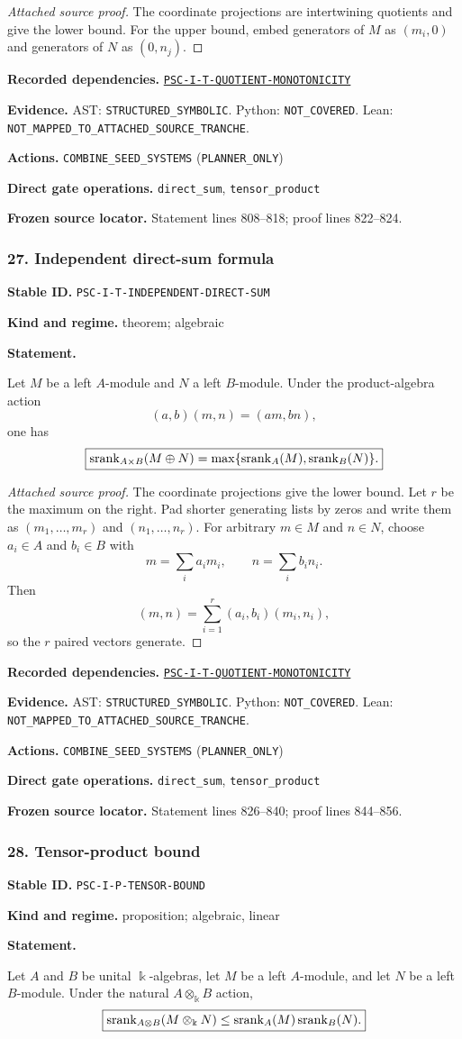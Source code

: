 \documentclass[a4paper,11pt]{article}
\newcommand{\bbk}{\Bbbk}\newcommand{\A}{\mathcal A}\newcommand{\B}{\mathcal B}\newcommand{\Ccal}{\mathcal C}\newcommand{\Pcal}{\mathcal P}\newcommand{\Qcal}{\mathcal Q}\newcommand{\Rcal}{\mathcal R}\newcommand{\Scal}{\mathcal S}
\newcommand{\field}[2]{\noindent\textbf{#1.} #2\par}
\begin{document}
\begin{proof}[Attached source proof]
The coordinate projections are intertwining quotients and give the lower bound.  For the upper bound, embed generators of $M$ as $(m_i,0)$ and generators of $N$ as $(0,n_j)$.
\end{proof}
\field{Recorded dependencies}{\hyperref[rec:PSC-I-T-QUOTIENT-MONOTONICITY]{\nolinkurl{PSC-I-T-QUOTIENT-MONOTONICITY}}}
\field{Evidence}{AST: \nolinkurl{STRUCTURED_SYMBOLIC}. Python: \nolinkurl{NOT_COVERED}. Lean: \nolinkurl{NOT_MAPPED_TO_ATTACHED_SOURCE_TRANCHE}.}
\field{Actions}{\nolinkurl{COMBINE_SEED_SYSTEMS} (\nolinkurl{PLANNER_ONLY})}
\field{Direct gate operations}{\nolinkurl{direct_sum}, \nolinkurl{tensor_product}}
\field{Frozen source locator}{Statement lines 808--818; proof lines 822--824.}
\subsubsection*{27. Independent direct-sum formula}
\label{rec:PSC-I-T-INDEPENDENT-DIRECT-SUM}
\field{Stable ID}{\nolinkurl{PSC-I-T-INDEPENDENT-DIRECT-SUM}}
\field{Kind and regime}{theorem; algebraic}
\textbf{Statement.}\par
Let $M$ be a left $A$-module and $N$ a left $B$-module.  Under the product-algebra action
\[
(a,b)(m,n)=(am,bn),
\]
one has
\[
\boxed{
\operatorname{srank}_{A\times B}(M\oplus N)
=
\max\{\operatorname{srank}_A(M),\operatorname{srank}_B(N)\}.
}
\]

\begin{proof}[Attached source proof]
The coordinate projections give the lower bound.  Let $r$ be the maximum on the right.  Pad shorter generating lists by zeros and write them as $(m_1,\ldots,m_r)$ and $(n_1,\ldots,n_r)$.  For arbitrary $m\in M$ and $n\in N$, choose $a_i\in A$ and $b_i\in B$ with
\[
m=\sum_ia_im_i,
\qquad
n=\sum_ib_in_i.
\]
Then
\[
(m,n)=\sum_{i=1}^r(a_i,b_i)(m_i,n_i),
\]
so the $r$ paired vectors generate.
\end{proof}
\field{Recorded dependencies}{\hyperref[rec:PSC-I-T-QUOTIENT-MONOTONICITY]{\nolinkurl{PSC-I-T-QUOTIENT-MONOTONICITY}}}
\field{Evidence}{AST: \nolinkurl{STRUCTURED_SYMBOLIC}. Python: \nolinkurl{NOT_COVERED}. Lean: \nolinkurl{NOT_MAPPED_TO_ATTACHED_SOURCE_TRANCHE}.}
\field{Actions}{\nolinkurl{COMBINE_SEED_SYSTEMS} (\nolinkurl{PLANNER_ONLY})}
\field{Direct gate operations}{\nolinkurl{direct_sum}, \nolinkurl{tensor_product}}
\field{Frozen source locator}{Statement lines 826--840; proof lines 844--856.}
\subsubsection*{28. Tensor-product bound}
\label{rec:PSC-I-P-TENSOR-BOUND}
\field{Stable ID}{\nolinkurl{PSC-I-P-TENSOR-BOUND}}
\field{Kind and regime}{proposition; algebraic, linear}
\textbf{Statement.}\par
Let $A$ and $B$ be unital $\bbk$-algebras, let $M$ be a left $A$-module, and let $N$ be a left $B$-module.  Under the natural $A\otimes_{\bbk}B$ action,
\[
\boxed{
\srank_{A\otimes B}(M\otimes_{\bbk}N)
\leq
\srank_A(M)\srank_B(N).
}
\]
\end{document}

